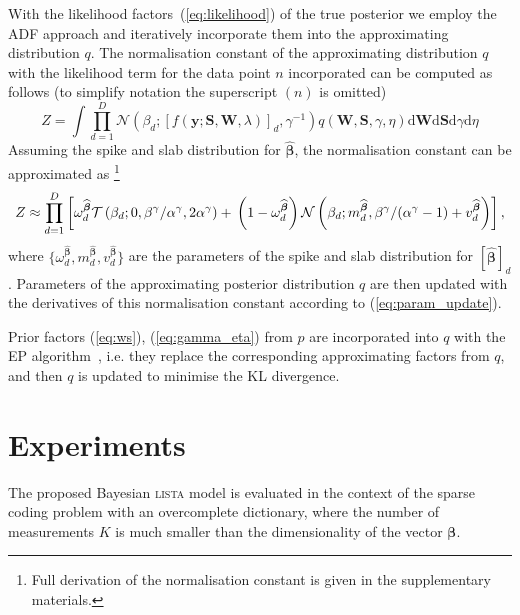 \documentclass{article}
\begin{document}
With the likelihood factors~(\ref{eq:likelihood}) of the true posterior we employ the ADF approach and iteratively incorporate them into the approximating distribution $q$. The normalisation constant of the approximating distribution $q$ with the likelihood term for the data point $n$ incorporated can be computed as follows (to simplify notation the superscript $(n)$ is omitted)
\begin{equation}
Z  = \int \prod_{d=1}^{D} \mathcal{N}(\beta_d ; [f(\mathbf{y} ; \mathbf{S}, \mathbf{W}, \lambda)]_d, \gamma^{-1}) q(\mathbf{W}, \mathbf{S}, \gamma, \eta) \mathrm{d}\mathbf{W} \mathrm{d}\mathbf{S} \mathrm{d}\gamma \mathrm{d}\eta
\end{equation}
Assuming the spike and slab distribution for $\widehat{\boldsymbol\beta}$, the normalisation constant can be approximated as \footnote{Full derivation of the normalisation constant is given in the supplementary materials.}
\begin{equation}
\label{eq:Z}
Z \approx \prod_{d=1}^D \left[\omega^{\widehat{\boldsymbol\beta}}_d  \mathcal{T}\left(\beta_d ; 0, \beta^\gamma / \alpha^\gamma, 2\alpha^\gamma\right) + \vphantom{m^{\widehat{\boldsymbol\beta}}_d} \left(1 - \omega^{\widehat{\boldsymbol\beta}}_d\right)\mathcal{N}\left(\beta_d ; m^{\widehat{\boldsymbol\beta}}_d,  \beta^\gamma / (\alpha^\gamma - 1) + v^{\widehat{\boldsymbol\beta}}_d\right)\right],
\end{equation}
where $\{\omega^{\widehat{\boldsymbol\beta}}_d, m^{\widehat{\boldsymbol\beta}}_d, v^{\widehat{\boldsymbol\beta}}_d\}$ are the parameters of the spike and slab distribution for $[\widehat{\boldsymbol\beta}]_d$. Parameters of the approximating posterior distribution $q$ are then updated with the derivatives of this normalisation constant according to (\ref{eq:param_update}).

Prior factors (\ref{eq:ws}), (\ref{eq:gamma_eta}) from $p$ are incorporated into $q$ with the EP algorithm~\cite{hernandez2015probabilistic}, i.e. they replace the corresponding approximating factors from $q$, and then $q$ is updated to minimise the KL divergence.

\section{Experiments}
\label{sec:experiments}
The proposed Bayesian \textsc{lista} model is evaluated in the context of the sparse coding problem with an overcomplete dictionary, where the number of measurements $K$ is much smaller than the dimensionality of the vector $\boldsymbol\beta$.
\end{document}

